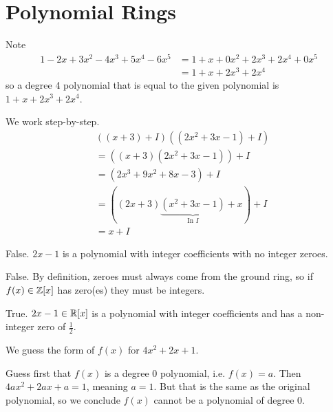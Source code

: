 \section{Polynomial Rings}
\begin{questions}
    \item Note
    \begin{align*}
        1 - 2x + 3x^2 - 4x^3 + 5x^4 - 6x^5 &= 1 + x + 0x^2 + 2x^3 + 2x^4 + 0x^5\\
        &= 1 + x + 2x^3 + 2x^4
    \end{align*}
    so a degree 4 polynomial that is equal to the given polynomial is $1 + x + 2x^3 + 2x^4$.

    \item We work step-by-step.
    \begin{align*}
        &\left((x + 3) + I\right)\left((2x^2 + 3x - 1) + I\right)\\
        &= \left((x + 3)(2x^2+3x-1)\right) + I\\
        &= \left(2x^3 + 9x^2 + 8x - 3\right) + I\\
        &= \left((2x+3)\underbrace{(x^2+3x-1)}_{\text{In }I} + x\right) + I\\
        &= x + I
    \end{align*}

    \item \begin{partquestions}{\alph*}
        \item False. $2x-1$ is a polynomial with integer coefficients with no integer zeroes.
        
        \item False. By definition, zeroes must always come from the ground ring, so if $f(x) \in \mathbb{Z}[x]$ has zero(es) they must be integers.
        
        \item True. $2x-1 \in \mathbb{R}[x]$ is a polynomial with integer coefficients and has a non-integer zero of $\frac12$.
    \end{partquestions}
    
    \item \begin{partquestions}{\alph*}
        \item We guess the form of $f(x)$ for $4x^2 + 2x + 1$. 
        
        Guess first that $f(x)$ is a degree 0 polynomial, i.e. $f(x) = a$. Then $4ax^2 + 2ax + a = 1$, meaning $a = 1$. But that is the same as the original polynomial, so we conclude $f(x)$ cannot be a polynomial of degree 0.


\end{partquestions}
\end{questions}
